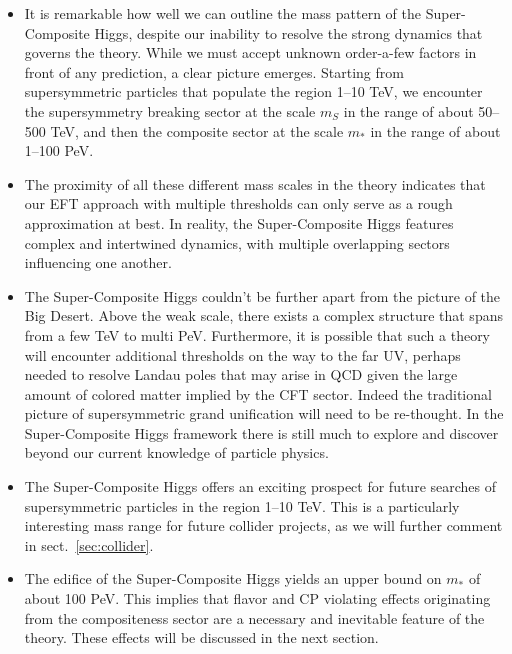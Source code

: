 \documentclass[a4paper,12pt]{article}
\def\sec#1{sect.~\ref{#1}}
\def\mst{m_*}
\def\mS{m_S}
\begin{document}
\begin{itemize}

\item It is remarkable how well we can outline the mass pattern of the Super-Composite Higgs, despite our inability to resolve the strong dynamics that governs the theory. While we must accept unknown order-a-few factors in front of any prediction, a clear picture emerges. Starting from supersymmetric particles that populate the region 1--10 TeV, we encounter the supersymmetry breaking sector at the scale $\mS$ in the range of about 50--500 TeV, and then the composite sector at the scale $\mst$ in the range of about 1--100 PeV.

\item The proximity of all these different mass scales in the theory indicates that our EFT approach with multiple thresholds can only serve as a rough approximation at best. In reality, the Super-Composite Higgs features complex and intertwined dynamics, with multiple overlapping sectors influencing one another.

\item The Super-Composite Higgs couldn't be further apart from the picture of the Big Desert. Above the weak scale, there exists a complex structure that spans from a few TeV to multi PeV. Furthermore, it is possible that such a theory will encounter additional thresholds on the way to the far UV, perhaps needed to resolve Landau poles that may arise in QCD given the large amount of colored matter implied by the CFT sector. Indeed the traditional picture of supersymmetric grand unification will need to be re-thought. In the 
 Super-Composite Higgs framework there is still much to explore and discover beyond our current knowledge of particle physics.

\item The Super-Composite Higgs offers an exciting prospect for future searches of supersymmetric particles in the region 1--10 TeV. This is a particularly interesting mass range for future collider projects, as we will further comment in \sec{sec:collider}.

\item The edifice of the Super-Composite Higgs yields an upper bound on $\mst$ of about 100 PeV. This implies that flavor and CP violating effects originating from the compositeness sector are a necessary and inevitable feature of the theory. These effects will be discussed in the next section.
\end{itemize}
\end{document}
